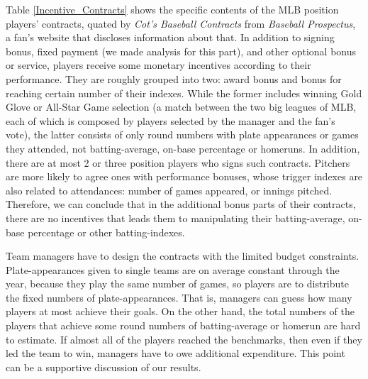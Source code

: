 \documentclass[dvipdfmx, 12pt]{article}
\begin{document}
Table \ref{Incentive_Contracts} shows the specific contents of the MLB position players' contracts, quated by \textit{Cot's Baseball Contracts} from \textit{Baseball Prospectus}, a fan's website that discloses information about that. In addition to signing bonus, fixed payment (we made analysis for this part), and other optional bonus or service, players receive some monetary incentives according to their performance. They are roughly grouped into two: award bonus and bonus for reaching certain number of their indexes. While the former includes winning Gold Glove or All-Star Game selection (a match between the two big leagues of MLB, each of which is composed by players selected by the manager and the fan's vote), the latter consists of only round numbers with plate appearances or games they attended, not batting-average, on-base percentage or homeruns. In addition, there are at most 2 or three position players who signs such contracts. Pitchers are more likely to agree ones with performance bonuses, whose trigger indexes are also related to attendances: number of games appeared, or innings pitched. Therefore, we can conclude that in the additional bonus parts of their contracts, there are no incentives that leads them to manipulating  their batting-average, on-base percentage or other batting-indexes.

Team managers have to design the contracts with the limited budget constraints. Plate-appearances given to single teams are on average constant through the year, because they play the same number of games, so players are to distribute the fixed numbers of plate-appearances. That is, managers can guess how many players at most achieve their goals. On the other hand, the total numbers of the players that achieve some round numbers of batting-average or homerun are hard to estimate. If almost all of the players reached the benchmarks, then even if they led the team to win, managers have to owe additional expenditure. This point can be a supportive discussion of our results.
\end{document}
